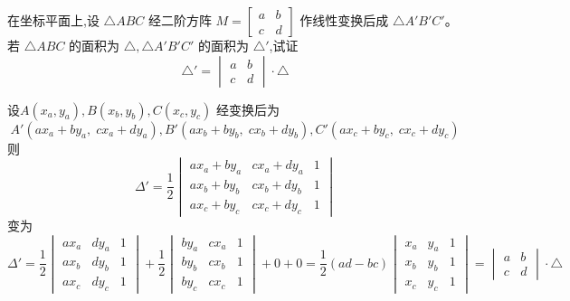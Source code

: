 \begin{questions}
    \question 在坐标平面上,设 $\triangle ABC$ 经二阶方阵 $M = \begin{bmatrix} a & b \\ c & d \end{bmatrix}$ 作线性变换后成 $\triangle A'B'C'$。若 $\triangle ABC$ 的面积为 $\triangle,\triangle A'B'C'$ 的面积为 $\triangle'$,试证$$\triangle' =  \begin{vmatrix} a & b \\ c & d \end{vmatrix} \cdot \triangle$$
    \begin{solution}
        设$A(x_a, y_a),B(x_b, y_b),C(x_c, y_c)$
        经变换后为
        \[
        A'(a x_a + b y_a,\; c x_a + d y_a),B'(a x_b + b y_b,\; c x_b + d y_b),C'(a x_c + b y_c,\; c x_c + d y_c)
        \]
        则
        \[
        \Delta' = \frac{1}{2}
        \begin{vmatrix}
        a x_a + b y_a & c x_a + d y_a & 1 \\
        a x_b + b y_b & c x_b + d y_b & 1 \\
        a x_c + b y_c & c x_c + d y_c & 1
        \end{vmatrix}
        \]
        变为
        \[
        \Delta' = \frac{1}{2} \begin{vmatrix}
        a x_a & d y_a & 1 \\
        a x_b & d y_b & 1 \\
        a x_c & d y_c & 1
        \end{vmatrix}
        +
        \frac{1}{2} \begin{vmatrix}
        b y_a & c x_a & 1 \\
        b y_b & c x_b & 1 \\
        b y_c & c x_c & 1
        \end{vmatrix} +0+0
        = \frac{1}{2}(ad-bc)
        \begin{vmatrix}
        x_a & y_a & 1 \\
        x_b & y_b & 1 \\
        x_c & y_c & 1
        \end{vmatrix}
        = \begin{vmatrix} a & b \\ c & d \end{vmatrix} \cdot \triangle
        \]
    \end{solution}


\end{questions}
